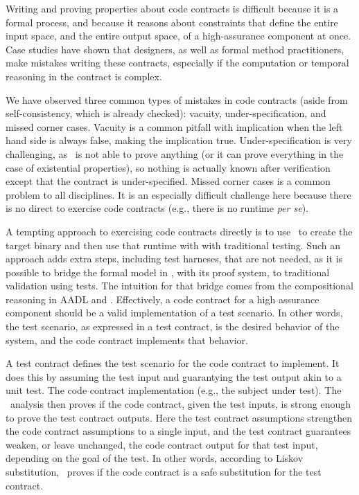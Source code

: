 Writing and proving properties about code contracts is difficult because it is a formal process, and because it reasons about constraints that define the entire input space, and the entire output space, of a high-assurance component at once.
Case studies have shown that designers, as well as formal method practitioners, make mistakes writing these contracts, especially if the computation or temporal reasoning in the contract is complex.

We have observed three common types of mistakes in code contracts (aside from self-consistency, which is
already checked): vacuity, under-specification, and missed corner cases.
Vacuity is a common pitfall with implication when the left hand side is always false, making the implication true. 
Under-specification is very challenging, as \agr\ is not able to prove anything (or it can prove everything in the case of existential properties), so nothing is actually known after verification except that the contract is under-specified. 
Missed corner cases is a common problem to all disciplines.
It is an especially difficult challenge here because there is no direct to exercise code contracts (e.g., there is no runtime \emph{per se}).

A tempting approach to exercising code contracts directly is to use \splt\ to create the target binary and then use that runtime with with traditional testing.
Such an approach adds extra steps, including test harneses, that are not needed, as it is
possible to bridge the formal model in \agr, with its proof system, to
traditional validation using tests.
The intuition for that bridge comes from the compositional reasoning in AADL and \agr. 
Effectively, a code contract for a high assurance component should be a valid implementation of a test scenario.
In other words, the test scenario, as expressed in a test contract, is the desired behavior of the system, and the code contract implements that behavior.

A test contract defines the test scenario for the code contract to implement.
It does this by assuming the test input and guarantying the test output akin to a unit test. 
The code contract implementation (e.g., the subject under test).
The \agr\ analysis then proves if the code contract, given the test inputs, is strong enough to prove the test contract outputs.
Here the test contract assumptions strengthen the code contract assumptions to a single input, and the test contract guarantees weaken, or leave unchanged, the code contract output for that test input, depending on the goal of the test.
In other words, according to Liskov substitution, \agr\ proves if the code contract is a safe substitution for the test contract.

